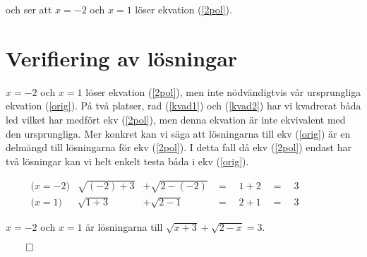 \documentclass{article}
\begin{document}
och ser att $x = -2$ och $x = 1$ löser ekvation (\ref{2pol}).

\section*{Verifiering av lösningar}

$x = -2$ och $x = 1$ löser ekvation (\ref{2pol}), men inte nödvändigtvis vår ursprungliga ekvation (\ref{orig}). På två platser, rad (\ref{kvad1}) och (\ref{kvad2}) har vi kvadrerat båda led vilket har medfört ekv (\ref{2pol}), men denna ekvation är inte ekvivalent med den ursprungliga. Mer konkret kan vi säga att lösningarna till ekv (\ref{orig}) är en delmängd till lösningarna för ekv (\ref{2pol}). I detta fall då ekv (\ref{2pol}) endast har två lösningar kan vi helt enkelt testa båda i ekv (\ref{orig}).

\begin{align*}
  & \text{($x = -2$)}&  \sqrt{(-2) + 3} &+ \sqrt{2 - (-2)} &= \quad 1 + 2 \quad = \quad 3 \quad\quad\quad&&\\
  & \text{($x = 1$)}&  \sqrt{1 + 3}    &+ \sqrt{2 - 1}    &= \quad 2 + 1 \quad =    \quad 3    \quad\quad\quad&&
\end{align*}

$x = -2$ och $x = 1$ är lösningarna till $\sqrt{x + 3} + \sqrt{2 - x} = 3$.

\centerline{$\qed$}
\end{document}
